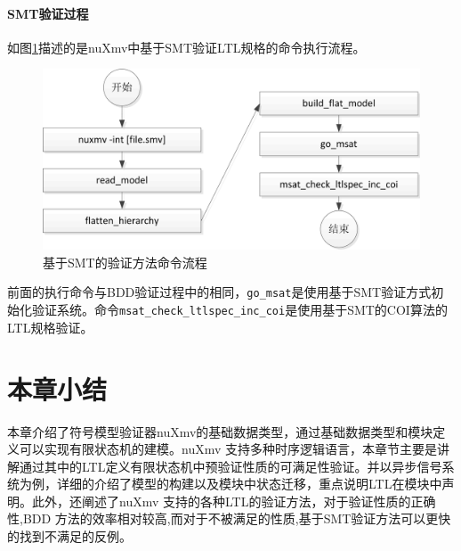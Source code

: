 \paragraph{SMT验证过程}
如图\ref{fig:smtcommod}描述的是nuXmv中基于SMT验证LTL规格的命令执行流程。

\begin{figure}[!hbt]
	\centering
	\includegraphics[width=5 in]{fig/smtcommod.png}
	\caption{基于SMT的验证方法命令流程}
	\label{fig:smtcommod}
\end{figure}

前面的执行命令与BDD验证过程中的相同，\verb|go_msat|是使用基于SMT验证方式初始化验证系统。命令\verb|msat_check_ltlspec_inc_coi|是使用基于SMT的COI算法的LTL规格验证。

\section{本章小结}
本章介绍了符号模型验证器nuXmv的基础数据类型，通过基础数据类型和模块定义可以实现有限状态机的建模。nuXmv 支持多种时序逻辑语言，本章节主要是讲解通过其中的LTL定义有限状态机中预验证性质的可满足性验证。并以异步信号系统为例，详细的介绍了模型的构建以及模块中状态迁移，重点说明LTL在模块中声明。此外，还阐述了nuXmv 支持的各种LTL的验证方法，对于验证性质的正确性,BDD 方法的效率相对较高,而对于不被满足的性质,基于SMT验证方法可以更快的找到不满足的反例。
